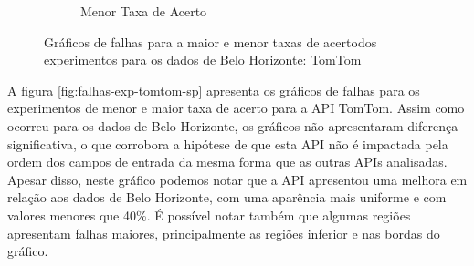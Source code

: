 \begin{figure}[ht]
\begin{subfigure}[b]{0.45\textwidth}
    \caption{Menor Taxa de Acerto}
    \label{fig:falhastomtomBHexpMenor}
  \end{subfigure}
  
  \caption{Gráficos de falhas para a maior e menor taxas de acertodos experimentos para os dados de Belo Horizonte: TomTom}
  \label{fig:falhas-exp-tomtom-bh}
\end{figure}

A figura \ref{fig:falhas-exp-tomtom-sp} apresenta os gráficos de falhas para os experimentos de menor e maior taxa de acerto para a API TomTom. Assim como ocorreu para os dados de Belo Horizonte, os gráficos não apresentaram diferença significativa, o que corrobora a hipótese de que esta API não é impactada pela ordem dos campos de entrada da mesma forma que as outras APIs analisadas. Apesar disso, neste gráfico podemos notar que a API apresentou uma melhora em relação aos dados de Belo Horizonte, com uma aparência mais uniforme e com valores menores que 40\%. É possível notar também que algumas regiões apresentam falhas maiores, principalmente as regiões inferior e nas bordas do gráfico.
 
